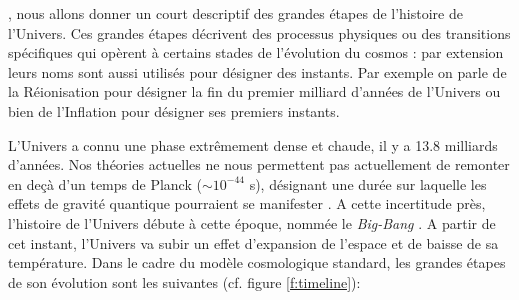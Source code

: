 , nous allons donner un court descriptif des grandes étapes de l'histoire de l'Univers. Ces grandes étapes décrivent des processus physiques ou des transitions spécifiques qui opèrent à certains stades de l'évolution du cosmos : par extension leurs noms sont aussi utilisés pour désigner des instants. Par exemple on parle de la Réionisation pour désigner la fin du premier milliard d'années de l'Univers ou bien de l'Inflation pour désigner ses premiers instants.

L'Univers a connu une phase extrêmement dense et chaude, il y a 13.8 milliards d'années. Nos théories actuelles ne nous permettent pas actuellement de remonter en deçà d'un temps de Planck ($\sim 10^{-44}$ s),  désignant une durée sur laquelle les effets de gravité quantique pourraient se manifester . A cette incertitude près, l'histoire de l'Univers débute à cette époque, nommée le \textit{Big-Bang} . A partir de cet instant, l'Univers va subir un effet d'expansion de l'espace et de baisse de sa température. Dans le cadre du modèle cosmologique standard, les grandes étapes de son évolution sont les suivantes (cf. figure \ref{f:timeline}):
